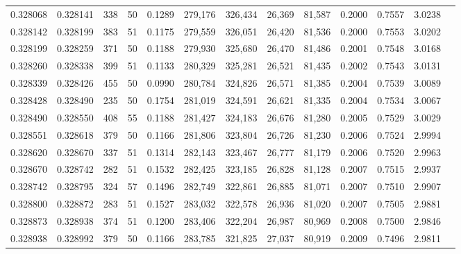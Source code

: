 \begin{tabular}{rrrrrrrrrrrrr}
0.328068 & 0.328141 &   338 &  50 &                                     0.1289 & 279,176 & 326,434 &  26,369 &  81,587 & 0.2000 & 0.7557 & 3.0238 \\
0.328142 & 0.328199 &   383 &  51 &                                     0.1175 & 279,559 & 326,051 &  26,420 &  81,536 & 0.2000 & 0.7553 & 3.0202 \\
0.328199 & 0.328259 &   371 &  50 &                                     0.1188 & 279,930 & 325,680 &  26,470 &  81,486 & 0.2001 & 0.7548 & 3.0168 \\
0.328260 & 0.328338 &   399 &  51 &                                     0.1133 & 280,329 & 325,281 &  26,521 &  81,435 & 0.2002 & 0.7543 & 3.0131 \\
0.328339 & 0.328426 &   455 &  50 &                                     0.0990 & 280,784 & 324,826 &  26,571 &  81,385 & 0.2004 & 0.7539 & 3.0089 \\
0.328428 & 0.328490 &   235 &  50 &                                     0.1754 & 281,019 & 324,591 &  26,621 &  81,335 & 0.2004 & 0.7534 & 3.0067 \\
0.328490 & 0.328550 &   408 &  55 &                                     0.1188 & 281,427 & 324,183 &  26,676 &  81,280 & 0.2005 & 0.7529 & 3.0029 \\
0.328551 & 0.328618 &   379 &  50 &                                     0.1166 & 281,806 & 323,804 &  26,726 &  81,230 & 0.2006 & 0.7524 & 2.9994 \\
0.328620 & 0.328670 &   337 &  51 &                                     0.1314 & 282,143 & 323,467 &  26,777 &  81,179 & 0.2006 & 0.7520 & 2.9963 \\
0.328670 & 0.328742 &   282 &  51 &                                     0.1532 & 282,425 & 323,185 &  26,828 &  81,128 & 0.2007 & 0.7515 & 2.9937 \\
0.328742 & 0.328795 &   324 &  57 &                                     0.1496 & 282,749 & 322,861 &  26,885 &  81,071 & 0.2007 & 0.7510 & 2.9907 \\
0.328800 & 0.328872 &   283 &  51 &                                     0.1527 & 283,032 & 322,578 &  26,936 &  81,020 & 0.2007 & 0.7505 & 2.9881 \\
0.328873 & 0.328938 &   374 &  51 &                                     0.1200 & 283,406 & 322,204 &  26,987 &  80,969 & 0.2008 & 0.7500 & 2.9846 \\
0.328938 & 0.328992 &   379 &  50 &                                     0.1166 & 283,785 & 321,825 &  27,037 &  80,919 & 0.2009 & 0.7496 & 2.9811 \\

\end{tabular}
